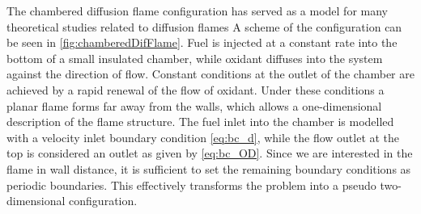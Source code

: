 The chambered diffusion flame configuration has served as a model for many theoretical studies related to diffusion flames\cite{matalonEffectThermalExpansion2010,rameauNumericalBifurcationChambered1985,matalonDiffusionFlamesChamber1980} A scheme of the configuration can be seen in \cref{fig:chamberedDifFlame}. Fuel is injected at a constant rate into the bottom of a small insulated chamber, while oxidant diffuses into the system against the direction of flow. Constant conditions at the outlet of the chamber are achieved by a rapid renewal of the flow of oxidant.  Under these conditions a planar flame forms far away from the walls, which allows a one-dimensional description of the flame structure.
The fuel inlet into the chamber is modelled with a velocity inlet boundary condition \cref{eq:bc_d}, while the flow outlet at the top is considered an outlet as given by \cref{eq:bc_OD}. Since we are interested in the flame in wall distance, it is sufficient to set the remaining boundary conditions as periodic boundaries. This effectively transforms the problem into a pseudo two-dimensional configuration. 


